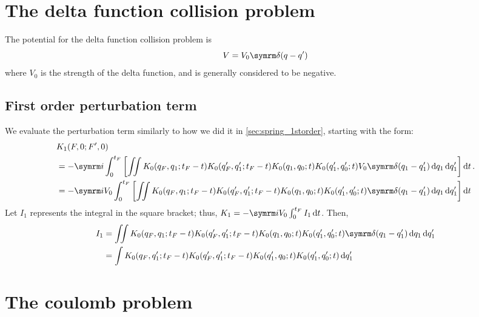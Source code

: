 \section{The delta function collision problem}

The potential for the delta function collision problem is
\begin{equation}
    V = V_0\ddel(q - q')
\end{equation}
where $V_0$ is the strength of the delta function, and is generally considered to be negative.

\subsection{First order perturbation term}

We evaluate the perturbation term similarly to how we did it in \cref{sec:spring_1storder}, starting with the form:
\begin{align}
    &K_1(F, 0; F', 0) \\
    &= -\im\int_0^{t_F}\left[\iint K_0(q_F, q_1; t_F - t)K_0(q_F', q_1'; t_F - t)K_0(q_1, q_0; t)K_0(q_1', q_0'; t)V_0\ddel(q_1 - q_1')\dd{q_1}\dd{q_1'}\right]\dd{t}. \nonumber \\
    &= -\im V_0\int_0^{t_F}\left[\iint K_0(q_F, q_1; t_F - t)K_0(q_F', q_1'; t_F - t)K_0(q_1, q_0; t)K_0(q_1', q_0'; t)\ddel(q_1 - q_1')\dd{q_1}\dd{q_1'}\right]\dd{t} \nonumber
\end{align}
Let $I_1$ represents the integral in the square bracket; thus, $K_1 = -\im V_0\int_{0}^{t_F}I_1\dd{t}$. Then,
\begin{align}
    I_1 &= \iint K_0(q_F, q_1; t_F - t)K_0(q_F', q_1'; t_F - t)K_0(q_1, q_0; t)K_0(q_1', q_0'; t)\ddel(q_1 - q_1')\dd{q_1}\dd{q_1'} \\
    &= \int K_0(q_F, q_1'; t_F - t)K_0(q_F', q_1'; t_F - t)K_0(q_1', q_0; t)K_0(q_1', q_0'; t)\dd{q_1'}
\end{align}

\section{The coulomb problem}
